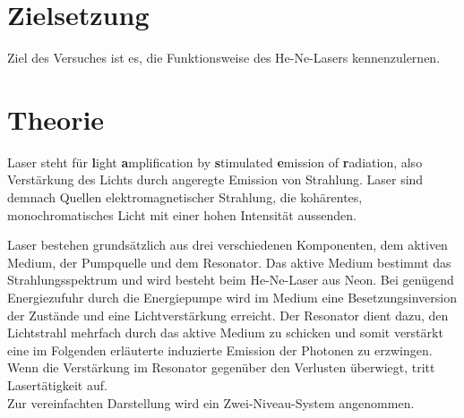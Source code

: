 \section{Zielsetzung}
\label{sec:Zielsetzung}
Ziel des Versuches ist es, die Funktionsweise des He-Ne-Lasers kennenzulernen.

\section{Theorie}
\label{sec:Theorie}

Laser steht für \textbf{l}ight \textbf{a}mplification by \textbf{s}timulated \textbf{e}mission of \textbf{r}adiation, also
Verstärkung des Lichts durch angeregte Emission von Strahlung.
Laser sind demnach Quellen elektromagnetischer Strahlung, die kohärentes, monochromatisches Licht mit einer hohen Intensität aussenden.

Laser bestehen grundsätzlich aus drei verschiedenen Komponenten, dem aktiven Medium, der Pumpquelle und dem Resonator.
Das aktive Medium bestimmt das Strahlungsspektrum und wird besteht beim He-Ne-Laser aus Neon.
Bei genügend Energiezufuhr durch die Energiepumpe wird im Medium eine Besetzungsinversion der Zustände und eine Lichtverstärkung erreicht.
Der Resonator dient dazu, den Lichtstrahl mehrfach durch das aktive Medium zu schicken und somit verstärkt eine im Folgenden erläuterte
induzierte Emission der Photonen zu erzwingen.
Wenn die Verstärkung im Resonator gegenüber den Verlusten überwiegt, tritt Lasertätigkeit auf.\\


Zur vereinfachten Darstellung wird ein Zwei-Niveau-System angenommen.
